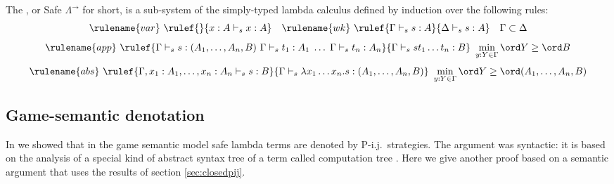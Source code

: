 \begin{definition}\rm
The , or Safe $\Lambda^{\rightarrow}$ for short, is a sub-system of the
  simply-typed lambda calculus defined by induction over the
  following rules:
$$ \rulename{var} \ \rulef{}{x : A\vdash_s x : A} \quad
\rulename{wk} \ \rulef{\Gamma \vdash_s s : A}{\Delta \vdash_s s : A} \quad
\Gamma \subset \Delta$$
$$ \rulename{app} \ \rulef{\Gamma \vdash_s s : (A_1,\ldots,A_n,B) \
  \Gamma \vdash_s t_1 : A_1 \; \ldots \; \Gamma \vdash_s t_n : A_n
} {\Gamma \vdash_s s t_1 \ldots t_n : B} \ \min_{y:Y \in \Gamma} \ord Y \geq \ord B$$
$$ \rulename{abs} \ \rulef{\Gamma, x_1 : A_1, \ldots, x_n : A_n
  \vdash_s s : B} {\Gamma \vdash_s \lambda x_1 \ldots x_n . s :
  (A_1, \ldots ,A_n,B)} \ \min_{y:Y \in \Gamma} \ord Y \geq \ord (A_1, \ldots ,A_n,B)$$
\end{definition}


\subsection{Game-semantic denotation}

In \cite{blumong:safelambdacalculus} we showed that in the game
semantic model safe lambda terms are denoted by P-i.j.\ strategies.
The argument was syntactic: it is based on the analysis of a special
kind of abstract syntax tree of a term called computation tree
\cite{OngLics2006}. Here we give another proof based on a semantic
argument that uses the results of section \ref{sec:closedpij}.


